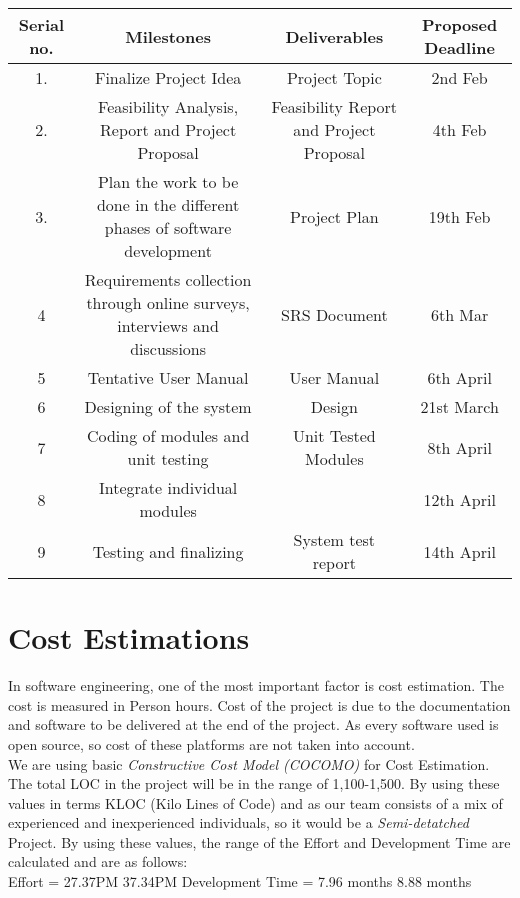 \documentclass[
10pt, %
a4paper, %
oneside, %
headinclude,footinclude, %
BCOR5mm, %
]{scrartcl}
\begin{document}
\begin{tabular}{|| c | c | c | c ||} 
 \hline
Serial no. & Milestones & 	Deliverables & Proposed Deadline   \\ [1.5ex] 
 \hline\hline
 1. &	Finalize Project Idea &	Project Topic &	2nd Feb\\ 
 \hline
 2. &	Feasibility Analysis, Report and Project Proposal &	Feasibility Report and Project Proposal	& 4th Feb \\
 \hline
 3. & Plan the work to be done in the different phases of software development	& Project Plan & 19th Feb \\
 \hline
4 &	Requirements collection through online surveys, interviews and discussions	& SRS Document & 6th Mar \\
 \hline
5 &	Tentative User Manual &	User Manual	& 6th April\\
\hline
6 &	Designing of the system &	Design &	21st March\\
\hline
7 &	Coding of modules and unit testing & Unit Tested Modules &	8th April\\
\hline
8 &	Integrate individual modules	& &	12th April\\
\hline
9 &	Testing and finalizing &	System test report &	14th April\\[1ex] 
 \hline
\end{tabular}



\section{Cost Estimations}
In software engineering, one of the most important factor is cost estimation. The cost is measured in Person hours. Cost of the project is due to the documentation and software to be delivered at the end of the project. As every software used is open source, so cost of these platforms are not taken into account.\vspace{0.5cm}\\ We are using basic \textit{Constructive Cost Model (COCOMO)} for Cost Estimation.\vspace{0.5cm}
\\The total LOC in the project will be in the range of 1,100-1,500. By using these values in terms KLOC (Kilo Lines of Code) and as our team consists of a mix of experienced and inexperienced individuals, so it would be a \textit{Semi-detatched} Project.\vspace{0.5cm}
By using these values, the range of the Eﬀort and Development Time are calculated and are as follows:\vspace{0.5cm}
\\Eﬀort = 27.37PM 37.34PM Development Time = 7.96 months 8.88 months
\end{document}
